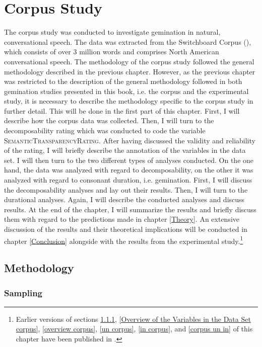 \chapter {Corpus Study}
\label{Corpus Studies}


The corpus study was conducted to investigate gemination in natural, conversational speech. 
The data was extracted from the Switchboard Corpus (\citealt{Godfrey.1997}), which consists of over 3 million words and comprises North American conversational speech. 
The methodology of the corpus study followed the general methodology described in the previous chapter. However, as the previous chapter was restricted to the description of the general methodology followed in both gemination studies presented in this book, i.e. the corpus and the experimental study,  it is necessary to describe the methodology specific to the corpus study in further detail. This will be done in the first part of this chapter.
 First, I will describe how the corpus data was collected. Then, I will turn to the decomposability rating which was conducted to code the variable \textsc{SemanticTransparencyRating}. After having discussed the validity and reliability of the rating, I will briefly describe the annotation of the variables in the data set. I will then turn to the two different types of analyses conducted.
 On the one hand, the data was analyzed with regard to decomposability, on the other it was analyzed with regard to consonant duration, i.e. gemination. 
First, I will discuss the decomposability analyses and lay out their results. 
Then, I will turn to the durational analyses. Again, I will describe the conducted analyses and discuss results.  At the end of the chapter, I will summarize the results and briefly discuss them with regard to the predictions made in chapter \ref{Theory}. An extensive discussion of the results and their theoretical implications will be conducted in chapter \ref{Conclusion} alongside with the results from the experimental study.\footnote{Earlier versions of sections \ref{sampling corpus},  \ref{Overview of the Variables in the Data Set corpus}, \ref{overview corpus}, \ref{un corpus}, \ref{in corpus}, and \ref{corpus un in} of this chapter have been published in \cite{BenHedia.2017}.} 


\section{Methodology}

\subsection{Sampling}\label{sampling corpus}

